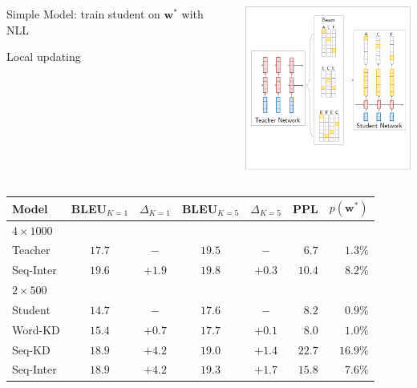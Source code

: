 \documentclass{beamer}
\newcommand{\air}{\vspace{0.25cm}}
\newcommand{\given}{\,|\,}
\newcommand{\wvec}{\mathbf{w}}
\newcommand{\cvec}{\mathbf{c}}
\newcommand{\Cite}[1]{{\footnotesize \citep{#1}}}
\begin{document}
\begin{frame}
\centerline{}
\air
\air  
\begin{columns}
\begin{column}{5.5cm}
Simple Model: train student on $\wvec^*$ with NLL
\air 

Local updating \Cite{Liang2006}

\end{column}
\begin{column}{5.5cm}
\includegraphics[width=5.5cm]{seq-kd-2}
\end{column}
\end{columns}
\end{frame}

\begin{frame}
\centerline{}
\air
\air
\begin{table}
\centering
\small
\begin{tabular}{lccccrr}
\toprule
Model &    BLEU$_{K=1}$   & $\Delta_{K=1}$ & BLEU$_{K=5}$ & $\Delta_{K=5}$ & PPL & $p(\wvec^*)$ \\
\midrule
$4 \times 1000$ \\
Teacher    & $17.7$ &  $-$ & $19.5$&   $-$ &   $6.7$ &  $1.3\%$ \\
\hspace{1mm} Seq-Inter    & $19.6$ & $+1.9$&  $19.8$& $+0.3$&   $10.4$ & $8.2\%$   \\
\midrule
$2 \times 500$ \\ 
Student  $\,$   & $14.7$ & $-$ & $17.6$&  $-$ &  $8.2$ & $0.9\%$  \\
\hspace{1mm} Word-KD  & $15.4$ & $+0.7$& $17.7$& $+0.1$&  $8.0$ & $1.0\%$  \\
\hspace{1mm} Seq-KD   & $18.9$ & $+\mathbf{4.2}$& $19.0$& $+1.4$&  $22.7$ & $16.9\%$ \\
\hspace{1mm} Seq-Inter  & $18.9$ & $+\mathbf{4.2}$&$19.3$ & $+\mathbf{1.7}$ &  $15.8$ & $7.6\%$  \\
\bottomrule
\end{tabular}

\end{table}
\air
\air
\end{frame}
\end{document}
